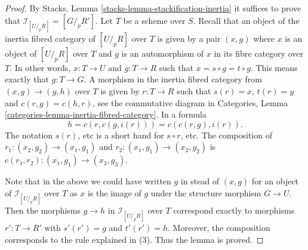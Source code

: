 \documentclass[10pt,a4paper]{amsart}
\theoremstyle{plain}
\theoremstyle{definition}
\theoremstyle{remark}
\numberwithin{equation}{subsection}
\begin{document}
\begin{proof}
By
Stacks, Lemma \ref{stacks-lemma-stackification-inertia}
it suffices to prove that $\mathcal{I}_{[U/_{\!p}R]} = [G/_{\!p} R']$.
Let $T$ be a scheme over $S$. Recall that an object of the inertia fibred
category of $[U/_{\!p}R]$ over $T$ is given by a pair
$(x, g)$ where $x$ is an object of $[U/_{\!\!p}R]$ over $T$
and $g$ is an automorphism of $x$ in its fibre category over $T$.
In other words, $x : T \to U$ and $g : T \to R$ such that
$x = s \circ g = t \circ g$. This means exactly that
$g : T \to G$. A morphism in the inertia fibred category
from $(x, g) \to (y, h)$ over $T$ is given by
$r : T \to R$ such that $s(r) = x$, $t(r) = y$
and $c(r, g) = c(h, r)$, see the commutative diagram in
Categories, Lemma \ref{categories-lemma-inertia-fibred-category}.
In a formula
$$
h = c(r, c(g, i(r))) = c(c(r, g), i(r)).
$$
The notation $s(r)$, etc is a short hand for $s \circ r$, etc.
The composition of $r_1 : (x_2, g_2) \to (x_1, g_1)$
and $r_2 : (x_1, g_1) \to (x_2, g_2)$ is
$c(r_1, r_2) : (x_1, g_1) \to (x_3, g_3)$.

\medskip\noindent
Note that in the above we could have written $g$ in stead of $(x, g)$
for an object of $\mathcal{I}_{[U/_{\!p}R]}$ over $T$ as $x$ is the
image of $g$ under the structure morphism $G \to U$. Then the morphisms
$g \to h$ in $\mathcal{I}_{[U/_{\!p}R]}$ over $T$ correspond exactly
to morphisms $r' : T \to R'$ with $s'(r') = g$ and $t'(r') = h$.
Moreover, the composition corresponds to the rule explained in (3).
Thus the lemma is proved.
\end{proof}
\end{document}
